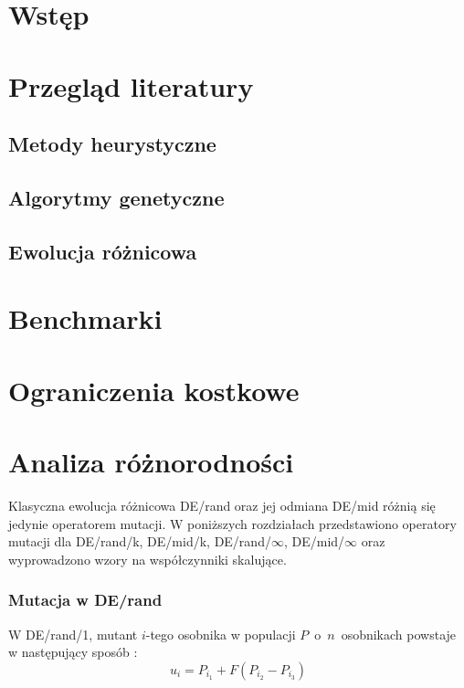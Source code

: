 \chapter{Wstęp}

\chapter{Przegląd literatury}

\section{Metody heurystyczne}

\section{Algorytmy genetyczne}

\section{Ewolucja różnicowa}

\chapter{Benchmarki}

\chapter{Ograniczenia kostkowe}

\chapter{Analiza różnorodności}

Klasyczna ewolucja różnicowa DE/rand oraz jej odmiana DE/mid różnią się jedynie operatorem mutacji.
W poniższych rozdziałach przedstawiono operatory mutacji dla DE/rand/k, DE/mid/k, DE/rand/$\infty$, DE/mid/$\infty$
oraz wyprowadzono wzory na współczynniki skalujące.

\subsection{Mutacja w DE/rand}

W DE/rand/1, mutant $i$-tego osobnika w populacji $P$~o~$n$~osobnikach powstaje w następujący sposób \cite{opara}:
\begin{equation} \label{eq:derand1}
u_i = P_{i_1} + F(P_{i_2} - P_{i_3})
\end{equation}

